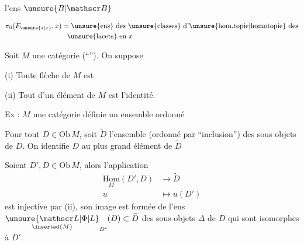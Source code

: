 
 l'ens \(\unsure{B|\mathscr B}\)


\[
\begin{aligned}
\pi_0(F_{\unsure{*|x}},x)&=\text{\unsure{ens} des \unsure{classes} d'\unsure{hom.topie|homotopie} des}\\
&\phantom{=}\text{\unsure{lacets} en }x
\end{aligned}
\]

Soit \(M\) une catégorie (``''). On suppose

(i) Toute flèche de \(M\) est 

(ii) Tout  d'un élément de \(M\) est l'identité.

Ex : \(M\) une catégorie définie  un ensemble ordonné

Pour tout \(D\in\mathrm{Ob}\,M\), soit \(\widetilde D\) l'ensemble (ordonné par ``inclusion'') des sous objets de \(D\). On identifie \(D\) au plus grand élément de \(\widetilde D\)

Soient \(D',D\in\mathrm{Ob}\,M\), alors l'application
\begingroup\makeatletter\tagsleft@true\makeatother
\[
\begin{aligned}
\underset{M}{\mathrm{Hom}}(D',D)&\longrightarrow\widetilde D\\
u&\longmapsto u(D')
\end{aligned}
\tag*{(\(\ast\))}
\]
\endgroup
est injective par (ii), son image est formée de l'ens 
\(\underset{\inserted{M}}{\unsure{\mathscr L|\Phi|L}}_{D'}(D)\subset\widetilde D\)
des sous-objets \(\Delta\) de \(D\) qui sont isomorphes à \(D'\).

